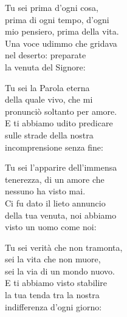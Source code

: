 
\strofa Tu sei prima d'ogni cosa,\\
prima di ogni tempo, d'ogni\\
mio pensiero, prima della vita.\\
Una voce udimmo che gridava\\
nel deserto: preparate\\
la venuta del Signore:

\spazio


\spazio

\strofa Tu sei la Parola eterna\\
della quale vivo, che mi\\
pronunciò soltanto per amore.\\
E ti abbiamo udito predicare\\
sulle strade della nostra\\
incomprensione senza fine:

\spazio


\spazio

\strofa Tu sei l'apparire dell'immensa\\
tenerezza, di un amore che\\
nessuno ha visto mai.\\
Ci fu dato il lieto annuncio\\
della tua venuta, noi abbiamo\\
visto un uomo come noi:

\spazio


\spazio

\strofa Tu sei verità che non tramonta,\\
sei la vita che non muore,\\
sei la via di un mondo nuovo.\\
E ti abbiamo visto stabilire\\
la tua tenda tra la nostra\\
indifferenza d'ogni giorno:

\spazio

